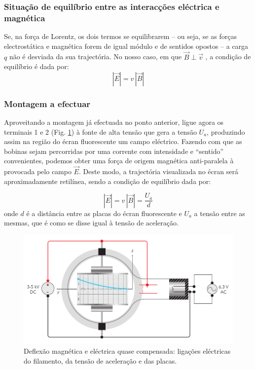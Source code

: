 \documentclass[a4paper,twoside,11pt]{report}      %
\begin{document}
\subsubsection{\sf Situação de equilíbrio entre as interacções eléctrica e magnética}

Se, na força de Lorentz, os dois termos se equilibrarem -- ou seja, se as forças electrostática e magnética forem de igual módulo e de sentidos opostos -- a carga $q$ não é desviada da sua trajectória. No nosso caso, em que $\vec{B} \perp \vec{v}$ , a condição de equilíbrio é dada por:
\begin{equation}
	\label{eq:equil1}
 |\vec{E}| = v\, |\vec{B}|
\end{equation}

\subsubsection{\sf Montagem a efectuar}

Aproveitando a montagem já efectuada no ponto anterior, ligue agora os terminais 1 e 2 (Fig. \ref{fig:TLE}) à fonte de alta tensão que gera a tensão $U_a$, produzindo assim na região do écran fluorescente um campo eléctrico. Fazendo com que as bobinas sejam percorridas por uma corrente com intensidade e  ``sentido'' convenientes, podemos obter uma força de origem magnética anti-paralela à provocada pelo campo $\vec{E}$. 
Deste modo, a trajectória visualizada no écran será aproximadamente retilínea, sendo a condição de equilíbrio dada por:

\begin{equation}
	\label{eq:equil2}
 |\vec{E}| = v\, |\vec{B}| = \frac{U_a}{d}
\end{equation}
onde $d$ é a distância entre as placas do écran fluorescente e $U_a$ a tensão entre as mesmas, que é como se disse igual à tensão de aceleração.

\begin{figure}
	[h]  \centering 
	\includegraphics[width=1\textwidth]{fig6-TuboTLE.pdf} 
	\caption{Deflexão magnética e eléctrica quase compensada: ligações eléctricas do filamento, da tensão de aceleração e das placas. \label{fig:TLE}} 
\end{figure}
\end{document}
